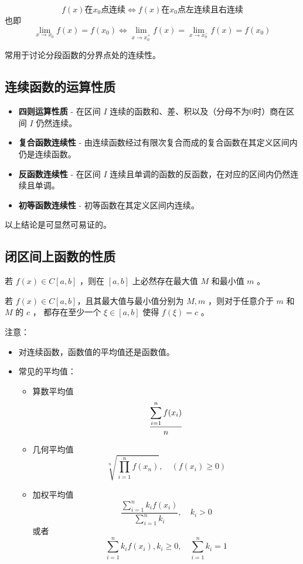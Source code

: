 \begin{Theo}[]

    $$
        f(x)\textrm{在}x_0\textrm{点连续}\Leftrightarrow
        f(x)\textrm{在}x_0\textrm{点左连续且右连续}
    $$ 
    也即$$
        {\displaystyle\lim_{x\rightarrow x_0}}f(x)=f(x_0)\Leftrightarrow
        {\displaystyle\lim_{x\rightarrow x_0^+}}f(x)={\displaystyle\lim_{x\rightarrow x_0^-}}f(x)=f(x_0)
    $$ 
\end{Theo}

常用于讨论分段函数的分界点处的连续性。

\subsection{连续函数的运算性质}

\begin{itemize}
    \item \textbf{四则运算性质} - 在区间 $ I $ 连续的函数和、差、积以及（分母不为0时）商在区间 $ I $ 仍然连续。
    \item \textbf{复合函数连续性} - 由连续函数经过有限次复合而成的复合函数在其定义区间内仍是连续函数。
    \item \textbf{反函数连续性} - 在区间 $ I $ 连续且单调的函数的反函数，在对应的区间内仍然连续且单调。
    \item \textbf{初等函数连续性} - 初等函数在其定义区间内连续。
\end{itemize}

以上结论是可显然可易证的。

\subsection{闭区间上函数的性质}

\begin{Theo}[最值定理]

    若 $ f(x)\in C[a,b] $ ，则在 $ [a,b] $ 上必然存在最大值 $ M $ 和最小值 $ m $ 。
\end{Theo}

\begin{Theo}[介值定理]

    若 $ f(x)\in C[a,b] $，且其最大值与最小值分别为 $ M,m $ ，则对于任意介于 $ m $ 和 $ M $ 的 $ c $ ，
    都存在至少一个 $ \xi\in[a,b] $ 使得 $ f(\xi)=c $ 。
\end{Theo}

注意：
\begin{itemize}
    \item 对连续函数，函数值的平均值还是函数值。
    \item 常见的平均值：\begin{itemize}
        \item 算数平均值$$
            \frac{\displaystyle \sum_{i=1}^n f(x_i)}{n}
        $$ 
        \item 几何平均值$$
            \sqrt[n]{\prod_{i=1}^n f(x_n)},\quad{} (f(x_i)\geq0)
        $$ 
        \item 加权平均值$$
            \frac{\sum_{i=1}^n k_if(x_i)}{\sum_{i=1}^nk_i},\quad{}k_i>0
        $$ 
        或者$$
            \sum_{i=1}^nk_i f(x_i),k_i\geq0,\quad{}\sum_{i=1}^nk_i=1
        $$ 
    \end{itemize}
\end{itemize}

